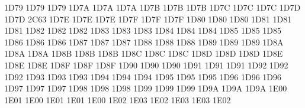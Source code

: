\setcclcucx 1D79 1D79 1D79 %
\setcclcucx 1D7A 1D7A 1D7A %
\setcclcucx 1D7B 1D7B 1D7B %
\setcclcucx 1D7C 1D7C 1D7C %
\setcclcucx 1D7D 1D7D 2C63 %
\setcclcucx 1D7E 1D7E 1D7E %
\setcclcucx 1D7F 1D7F 1D7F %
\setcclcucx 1D80 1D80 1D80 %
\setcclcucx 1D81 1D81 1D81 %
\setcclcucx 1D82 1D82 1D82 %
\setcclcucx 1D83 1D83 1D83 %
\setcclcucx 1D84 1D84 1D84 %
\setcclcucx 1D85 1D85 1D85 %
\setcclcucx 1D86 1D86 1D86 %
\setcclcucx 1D87 1D87 1D87 %
\setcclcucx 1D88 1D88 1D88 %
\setcclcucx 1D89 1D89 1D89 %
\setcclcucx 1D8A 1D8A 1D8A %
\setcclcucx 1D8B 1D8B 1D8B %
\setcclcucx 1D8C 1D8C 1D8C %
\setcclcucx 1D8D 1D8D 1D8D %
\setcclcucx 1D8E 1D8E 1D8E %
\setcclcucx 1D8F 1D8F 1D8F %
\setcclcucx 1D90 1D90 1D90 %
\setcclcucx 1D91 1D91 1D91 %
\setcclcucx 1D92 1D92 1D92 %
\setcclcucx 1D93 1D93 1D93 %
\setcclcucx 1D94 1D94 1D94 %
\setcclcucx 1D95 1D95 1D95 %
\setcclcucx 1D96 1D96 1D96 %
\setcclcucx 1D97 1D97 1D97 %
\setcclcucx 1D98 1D98 1D98 %
\setcclcucx 1D99 1D99 1D99 %
\setcclcucx 1D9A 1D9A 1D9A %
\setcclcucx 1E00 1E01 1E00 %
\setcclcucx 1E01 1E01 1E00 %
\setcclcucx 1E02 1E03 1E02 %
\setcclcucx 1E03 1E03 1E02 %
